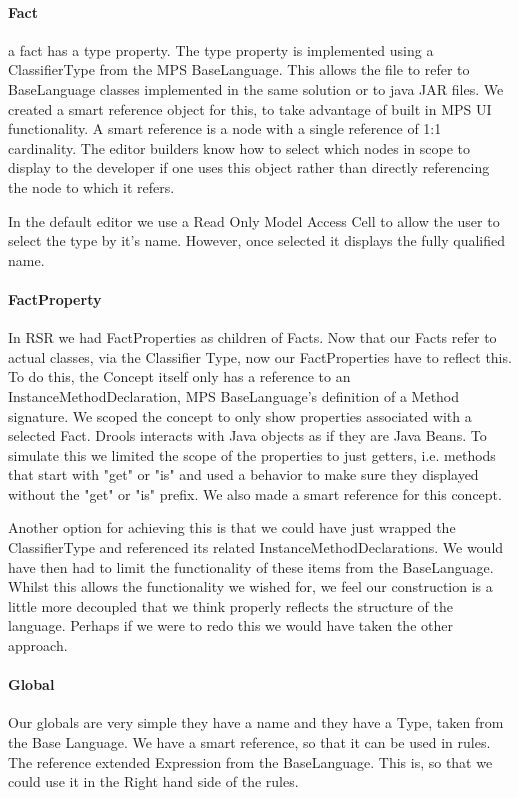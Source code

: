 \paragraph{Fact} a fact has a type property. 
The type property is implemented using a ClassifierType from the MPS BaseLanguage.
This allows the file to refer to BaseLanguage classes implemented in the same solution or to java JAR files.
We created a smart reference object for this, to take advantage of built in MPS UI functionality.
A smart reference is a node with a single reference of 1:1 cardinality.
The editor builders know how to select which nodes in scope to display to the developer if one uses this object rather than directly referencing the node to which it refers.

In the default editor we use a Read Only Model Access Cell to allow the user to select the type by it's name.
However, once selected it displays the fully qualified name.

\paragraph{FactProperty} In RSR we had FactProperties as children of Facts. 
Now that our Facts refer to actual classes, via the Classifier Type, now our FactProperties have to reflect this.
To do this, the Concept itself only has a reference to an InstanceMethodDeclaration, MPS BaseLanguage's definition of a Method signature.
We scoped the concept to only show properties associated with a selected Fact.
Drools interacts with Java objects as if they are Java Beans.
To simulate this we limited the scope of the properties to just getters, i.e. methods that start with "get" or "is" and used a behavior to make sure they displayed without the "get" or "is" prefix.
We also made a smart reference for this concept.

Another option for achieving this is that we could have just wrapped the ClassifierType and referenced its related InstanceMethodDeclarations.
We would have then had to limit the functionality of these items from the BaseLanguage.
Whilst this allows the functionality we wished for, we feel our construction is a little more decoupled that we think properly reflects the structure of the language.
Perhaps if we were to redo this we would have taken the other approach.

\paragraph{Global} Our globals are very simple they have a name and they have a Type, taken from the Base Language.
We have a smart reference, so that it can be used in rules.
The reference extended Expression from the BaseLanguage.
This is, so that we could use it in the Right hand side of the rules. 

